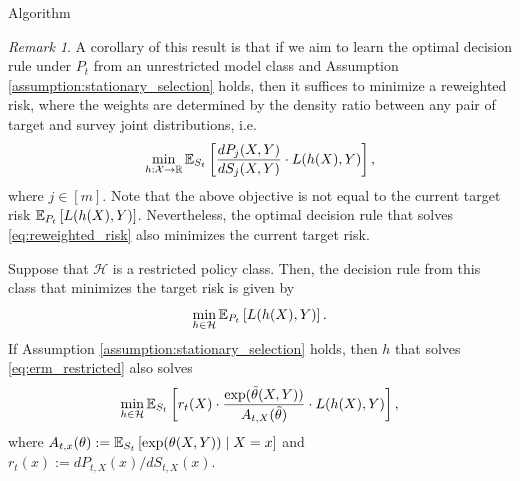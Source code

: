 \documentclass{article}
\theoremstyle{definition}
\theoremstyle{plain}
\theoremstyle{remark}
\newtheorem{rema}{Remark}
\begin{document}
\begin{section}{Algorithm}
\begin{rema}
A corollary of this result is that if we aim to learn the optimal decision rule under $P_{t}$ from an unrestricted model class and Assumption \ref{assumption:stationary_selection} holds, then it suffices to minimize a reweighted risk, where the weights are determined by the density ratio between any pair of target and survey joint distributions, i.e.
\begin{equation} \label{eq:reweighted_risk} \min_{h: \mathcal{X} \rightarrow \mathbb{R}} \EE[S_{t}]{\frac{dP_{j}(X, Y)}{dS_{j} (X, Y)}\cdot L(h(X), Y)},\end{equation}
where $j \in [m].$ Note that the above objective is not equal to the current target risk $\EE[P_{t}]{L(h(X), Y)}$. Nevertheless, the optimal decision rule that solves \eqref{eq:reweighted_risk} also minimizes the current target risk.
\end{rema}

Suppose that $\mathcal{H}$ is a restricted policy class. Then, the decision rule from this class that minimizes the target risk is given by
\begin{equation} \label{eq:erm_restricted} \min_{h \in \mathcal{H}} \EE[P_{t}]{L(h(X), Y)}.\end{equation}
If Assumption \ref{assumption:stationary_selection} holds, then $h$ that solves \eqref{eq:erm_restricted} also solves
\[ \min_{h \in \mathcal{H}} \EE[S_{t}]{r_{t}(X) \cdot \frac{\exp(\tilde{\theta}(X, Y))}{A_{t, X}(\tilde{\theta})} \cdot L(h(X), Y)},\]
where $A_{t, x}(\theta):= \EE[S_{t}]{\exp(\theta(X, Y)) \mid X=x}$ and $r_{t}(x) := dP_{t, X}(x) / dS_{t, X}(x).$




\end{section}
\end{document}
